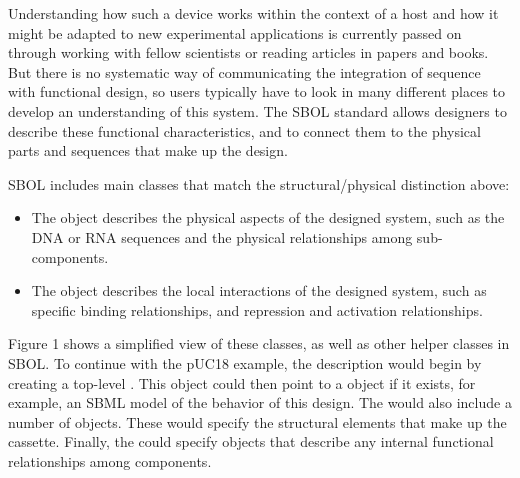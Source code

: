 Understanding how such a device works within the context of a host and how it might be adapted to new experimental applications is currently passed on through working with fellow scientists or reading articles in papers and books. But there is no systematic way of communicating the integration of sequence with functional design, so users typically have to look in many different places to develop an understanding of this system.  
The SBOL standard allows designers to describe these functional characteristics, and to connect them to the physical parts and sequences that make up the design. 

SBOL includes main classes that match the structural/physical distinction above:
\begin{itemize}
\item The  object describes the physical aspects of the designed system, such as the DNA or RNA sequences and the physical relationships among sub-components.
\item The  object describes the local interactions of the designed system, such as specific binding relationships, and repression and activation relationships. 
\end{itemize}

Figure 1 shows a simplified view of these classes, as well as other helper classes in SBOL. To continue with the pUC18 example, the description would begin by creating a top-level . This object could then point to a  object if it exists, for example, an SBML model of the behavior of this design. The  would also include a number of  objects. These would specify the structural elements that make up the cassette. Finally, the  could specify  objects that describe any internal functional relationships among components. 


